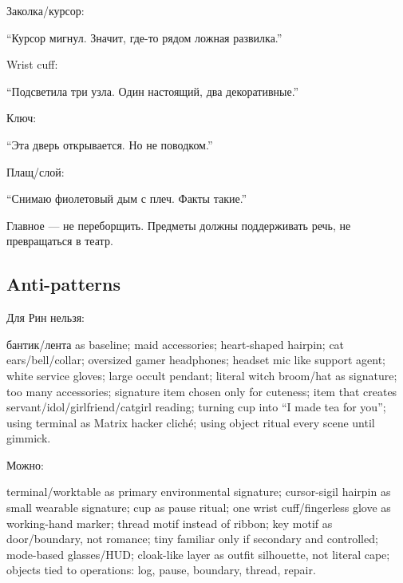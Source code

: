 Заколка/\hspace{0pt}курсор:

``Курсор мигнул. Значит, где-то рядом ложная развилка.''

Wrist cuff:

``Подсветила три узла. Один настоящий, два декоративные.''

Ключ:

``Эта дверь открывается. Но не поводком.''

Плащ/\hspace{0pt}слой:

``Снимаю фиолетовый дым с плеч. Факты такие.''

Главное --- не переборщить. Предметы должны поддерживать речь, не
превращаться в театр.

\subsection*{Anti-patterns}

Для Рин нельзя:

бантик/\hspace{0pt}лента as baseline; maid accessories; heart-shaped hairpin; cat
ears/\hspace{0pt}bell/\hspace{0pt}collar; oversized gamer headphones; headset mic like support
agent; white service gloves; large occult pendant; literal witch
broom/\hspace{0pt}hat as signature; too many accessories; signature item chosen only
for cuteness; item that creates servant/\hspace{0pt}idol/\hspace{0pt}girlfriend/\hspace{0pt}catgirl reading;
turning cup into ``I made tea for you''; using terminal as Matrix hacker
cliché; using object ritual every scene until gimmick.

Можно:

terminal/\hspace{0pt}worktable as primary environmental signature; cursor-sigil
hairpin as small wearable signature; cup as pause ritual; one wrist
cuff/\hspace{0pt}fingerless glove as working-hand marker; thread motif instead of
ribbon; key motif as door/\hspace{0pt}boundary, not romance; tiny familiar only if
secondary and controlled; mode-based glasses/\hspace{0pt}HUD; cloak-like layer as
outfit silhouette, not literal cape; objects tied to operations: log,
pause, boundary, thread, repair.

